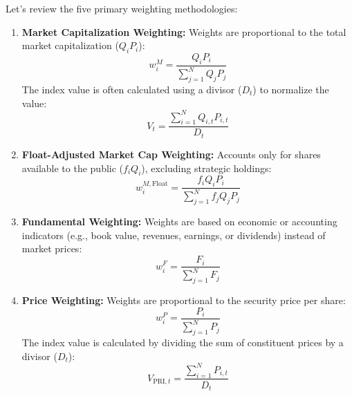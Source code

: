 Let's review the five primary weighting methodologies:
\begin{enumerate}
	\item \textbf{Market Capitalization Weighting:} Weights are proportional to the total market capitalization ($Q_i P_i$):
	      \begin{equation}
		      w_i^M = \frac{Q_i P_i}{\sum_{j=1}^{N} Q_j P_j}
		      \label{eq:market_cap_weight}
	      \end{equation}
	      The index value is often calculated using a divisor ($D_t$) to normalize the value:
	      \begin{equation}
		      V_t = \frac{\sum_{i=1}^{N} Q_{i,t} P_{i,t}}{D_t}
		      \label{eq:divisor_index_value}
	      \end{equation}

	\item \textbf{Float-Adjusted Market Cap Weighting:} Accounts only for shares available to the public ($f_i Q_i$), excluding strategic holdings:
	      \begin{equation}
		      w_i^{M,\text{Float}} = \frac{f_i Q_i P_i}{\sum_{j=1}^{N} f_j Q_j P_j}
		      \label{eq:float_adjusted_weight}
	      \end{equation}

	\item \textbf{Fundamental Weighting:} Weights are based on economic or accounting indicators (e.g., book value, revenues, earnings, or dividends) instead of market prices:
	      \begin{equation}
		      w_i^F = \frac{F_i}{\sum_{j=1}^{N} F_j}
		      \label{eq:fundamental_weight}
	      \end{equation}

	\item \textbf{Price Weighting:} Weights are proportional to the security price per share:
	      \begin{equation}
		      w_i^P = \frac{P_i}{\sum_{j=1}^{N} P_j}
		      \label{eq:price_weight}
	      \end{equation}
	      The index value is calculated by dividing the sum of constituent prices by a divisor ($D_t$):
	      \begin{equation}
		      V_{\text{PRI},t} = \frac{\sum_{i=1}^{N} P_{i,t}}{D_t}
		      \label{eq:price_weighted_value}
	      \end{equation}


\end{enumerate}
